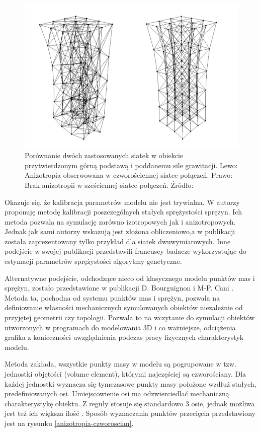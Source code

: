 \begin{figure}[ht]
\centering
\includegraphics[scale=0.5]{images/anisotropy.png}
\caption{Porównanie dwóch zastosowanych siatek w obiekcie przytwierdzonym górną podstawą i poddanemu sile grawitacji. Lewo: Anizotropia obserwowana w czworościennej siatce połączeń. Prawo: Brak anizotropii w sześciennej siatce połączeń. Źródło: \cite{ca}}
\label{anizotropia}
\end{figure}

Okazuje się, że kalibracja parametrów modelu nie jest trywialna. W \cite{usa} autorzy proponuję metodę kalibracji poszczególnych stałych sprężystości sprężyn. Ich metoda pozwala na symulację zarówno izotropowych jak i anizotropowych. Jednak jak sami autorzy wskazują jest złożona obliczeniowo,a w publikacji została zaprezentowany tylko przykład dla siatek dwuwymiarowych. Inne podejście w swojej publikacji przedstawili francuscy badacze wykorzystując do estymacji parametrów sprężystości algorytmy genetyczne.\cite{ei}

Alternatywne podejście, odchodzące nieco od klasycznego modelu punktów mas i sprężyn, zostało przedstawione w publikacji D. Bourguignon i M-P. Cani \cite{ca}. Metoda ta, pochodna od systemu punktów mas i sprężyn, pozwala na definiowanie własności mechanicznych symulowanych obiektów niezależnie od przyjętej geometrii czy topologii. Pozwala to na wczytanie do symulacji obiektów utworzonych w programach do modelowania 3D i co ważniejsze, odciążenia grafika z konieczności uwzględnienia podczas pracy fizycznych charakterystyk modelu.\cite{ca}

Metoda zakłada, wszystkie punkty masy w modelu są pogrupowane w tzw. jednostki objętości (volume element), którymi najczęściej są czworościany. Dla każdej jednostki wyznacza się tymczasowe punkty masy położone wzdłuż stałych, predefiniowanych osi. Umiejscowienie osi ma odzwierciedlać mechaniczną charakterystykę obiektu. Z reguły stosuje się standardowo 3 osie, jednak możliwa jest też ich większa ilość \cite{ca}. Sposób wyznaczania punktów przecięcia przedstawiony jest na rysunku \ref{anizotropia-czworoscian}.

